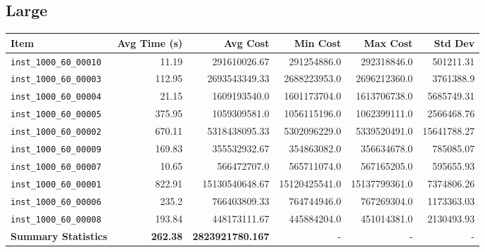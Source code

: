 \documentclass{article}
\begin{document}
\subsection*{Large}
\begin{table}[H]
	\centering
        \hspace*{-2cm}
	\begin{tabular}{lrrrrr}
		\toprule
		\textbf{Item} & \textbf{Avg Time (s)} & \textbf{Avg Cost} & \textbf{Min Cost} & \textbf{Max Cost} & \textbf{Std Dev} \\
		\midrule
		\texttt{inst\_1000\_60\_00010} & 11.19 & 291610026.67 & 291254886.0 & 292318846.0 & 501211.31 \\ 
		\texttt{inst\_1000\_60\_00003} & 112.95 & 2693543349.33 & 2688223953.0 & 2696212360.0 & 3761388.9 \\ 
		\texttt{inst\_1000\_60\_00004} & 21.15 & 1609193540.0 & 1601173704.0 & 1613706738.0 & 5685749.31 \\ \texttt{inst\_1000\_60\_00005} & 375.95 & 1059309581.0 & 1056115196.0 & 1062399111.0 & 2566468.76 \\ 
		\texttt{inst\_1000\_60\_00002} & 670.11 & 5318438095.33 & 5302096229.0 & 5339520491.0 & 15641788.27 \\ 
		\texttt{inst\_1000\_60\_00009} & 169.83 & 355532932.67 & 354863082.0 & 356634678.0 & 785085.07 \\ \texttt{inst\_1000\_60\_00007} & 10.65 & 566472707.0 & 565711074.0 & 567165205.0 & 595655.93 \\ 
		\texttt{inst\_1000\_60\_00001} & 822.91 & 15130540648.67 & 15120425541.0 & 15137799361.0 & 7374806.26 \\ \texttt{inst\_1000\_60\_00006} & 235.2 & 766403809.33 & 764744946.0 & 767269304.0 & 1173363.03 \\ 
		\texttt{inst\_1000\_60\_00008} & 193.84 & 448173111.67 & 445884204.0 & 451014381.0 & 2130493.93 \\
		\midrule
		\textbf{Summary Statistics} & \textbf{262.38} & \textbf{2823921780.167} & - & - & - \\
		\bottomrule
	\end{tabular}
	\label{tab:large_performance_metrics_gvns}
\end{table}
\end{document}

